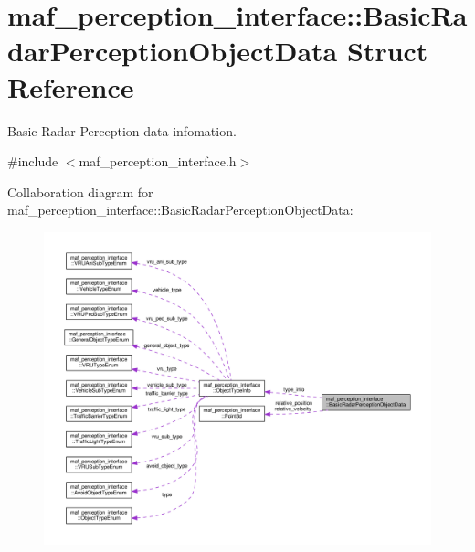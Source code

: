\hypertarget{structmaf__perception__interface_1_1BasicRadarPerceptionObjectData}{}\section{maf\+\_\+perception\+\_\+interface\+:\+:Basic\+Radar\+Perception\+Object\+Data Struct Reference}
\label{structmaf__perception__interface_1_1BasicRadarPerceptionObjectData}


Basic Radar Perception data infomation.  




{\ttfamily \#include $<$maf\+\_\+perception\+\_\+interface.\+h$>$}



Collaboration diagram for maf\+\_\+perception\+\_\+interface\+:\+:Basic\+Radar\+Perception\+Object\+Data\+:\nopagebreak
\begin{figure}[H]
\begin{center}
\leavevmode
\includegraphics[width=350pt]{structmaf__perception__interface_1_1BasicRadarPerceptionObjectData__coll__graph}
\end{center}
\end{figure}
